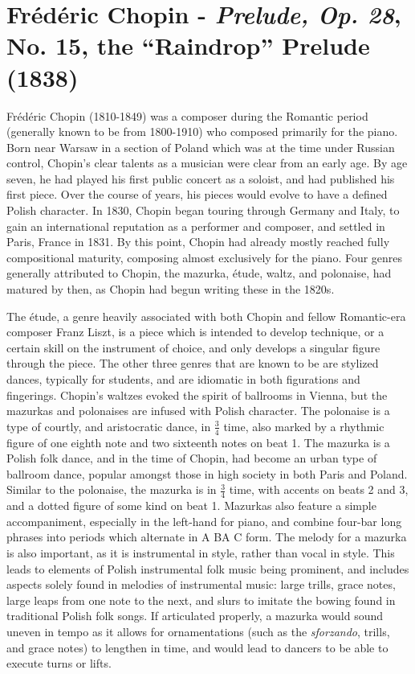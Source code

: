 \chapter[Chopin's Prelude, Op. 28, No. 15]{Frédéric Chopin - \textit{Prelude, Op. 28}, No. 15, the ``Raindrop'' Prelude (1838)}

Frédéric Chopin (1810-1849) was a composer during the Romantic period (generally known to be from 1800-1910) who composed primarily for the piano. Born near Warsaw in a section of Poland which was at the time under Russian control, Chopin's clear talents as a musician were clear from an early age. By age seven, he had played his first public concert as a soloist, and had published his first piece. Over the course of years, his pieces would evolve to have a defined Polish character. In 1830, Chopin began touring through Germany and Italy, to gain an international reputation as a performer and composer, and settled in Paris, France in 1831. By this point, Chopin had already mostly reached fully compositional maturity, composing almost exclusively for the piano. Four genres generally attributed to Chopin, the mazurka, étude, waltz, and polonaise, had matured by then, as Chopin had begun writing these in the 1820s\autocite{Burkholder_Grout_Palisca_2014}. 

The étude, a genre heavily associated with both Chopin and fellow Romantic-era composer Franz Liszt, is a piece which is intended to develop technique, or a certain skill on the instrument of choice, and only develops a singular figure through the piece. The other three genres that are known to be  are stylized dances, typically for students, and are idiomatic in both figurations and fingerings\autocite{Burkholder_Grout_Palisca_2014}. Chopin's waltzes evoked the spirit of ballrooms in Vienna, but the mazurkas and polonaises are infused with Polish character. The polonaise is a type of courtly, and aristocratic dance, in $\frac{3}{4}$ time, also marked by a rhythmic figure of one eighth note and two sixteenth notes on beat 1. The mazurka is a Polish folk dance, and in the time of Chopin, had become an urban type of ballroom dance, popular amongst those in high society in both Paris and Poland. Similar to the polonaise, the mazurka is in $\frac{3}{4}$ time, with accents on beats 2 and 3, and a dotted figure of some kind on beat 1. Mazurkas also feature a simple accompaniment, especially in the left-hand for piano, and combine four-bar long phrases into periods which alternate in A BA C form. The melody for a mazurka is also important, as it is instrumental in style, rather than vocal in style. This leads to elements of Polish instrumental folk music being prominent, and includes aspects solely found in melodies of instrumental music: large trills, grace notes, large leaps from one note to the next, and slurs to imitate the bowing found in traditional Polish folk songs. If articulated properly, a mazurka would sound uneven in tempo as it allows for ornamentations (such as the \textit{sforzando}, trills, and grace notes) to lengthen in time, and would lead to dancers to be able to execute turns or lifts. 


